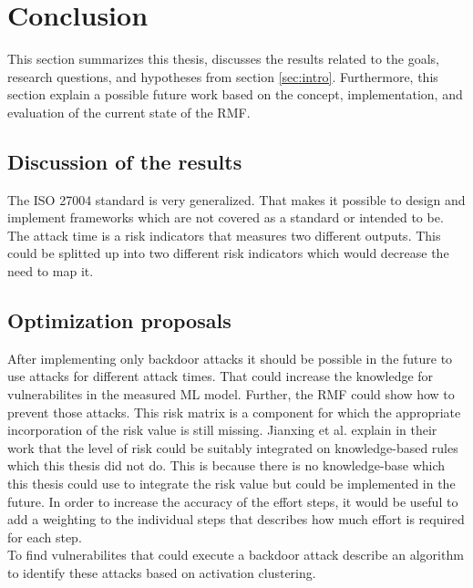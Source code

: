 \section{Conclusion}
\label{sec:conclusion}

This section summarizes this thesis, discusses the results related to the goals, research questions, and hypotheses from section \ref{sec:intro}. Furthermore, this section explain a possible future work based on the concept, implementation, and evaluation of the current state of the RMF.

\subsection{Discussion of the results}

The ISO 27004 standard is very generalized. That makes it possible to design and implement frameworks which are not covered as a standard or intended to be. The attack time is a risk indicators that measures two different outputs. This could be splitted up into two different risk indicators which would decrease the need to map it.

\subsection{Optimization proposals}

After implementing only backdoor attacks it should be possible in the future to use attacks for different attack times. That could increase the knowledge for vulnerabilites in the measured ML model. Further, the RMF could show how to prevent those attacks. This risk matrix is a component for which the appropriate incorporation of the risk value is still missing. Jianxing et al. \cite{DBLP:journals/access/JianxingHSH21} explain in their work that the level of risk could be suitably integrated on knowledge-based rules which this thesis did not do. This is because there is no knowledge-base which this thesis could use to integrate the risk value but could be implemented in the future. In order to increase the accuracy of the effort steps, it would be useful to add a weighting to the individual steps that describes how much effort is required for each step. \\
To find vulnerabilites that could execute a backdoor attack \cite{DBLP:journals/corr/abs-1811-03728} describe an algorithm to identify these attacks based on activation clustering.
